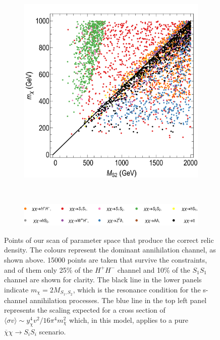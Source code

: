 \begin{figure}[t]
\begin{subfigure}[t]{0.43\textwidth}
\includegraphics[width=\textwidth]{texinputs/05_relic/figures/relic_scalar/MS2_mDM3.pdf}
\label{fig:scan1d}
\end{subfigure}\\
\begin{subfigure}[t]{0.86\textwidth}
\includegraphics[width=\textwidth]{texinputs/05_relic/figures/relic_scalar/LegendH2.pdf}
\end{subfigure}
\caption{Points of our scan of parameter space that produce the correct relic density. The colours represent the dominant annihilation channel, as shown above. 15000 points are taken that survive the constraints, and of them only 25\% of the $H^+H^-$ channel and 10\% of the $S_1S_1$ channel are shown for clarity. The black line in the lower panels indicate $m_\chi = 2 M_{S_1, S_2}$, which is the resonance condition for the s-channel annihilation processes. The blue line in the top left panel represents the scaling expected for a cross section of $\langle \sigma v \rangle \sim y^4_\chi v^2 / 16 \pi^4 m_\chi^2$ which, in this model, applies to a pure $\overline{\chi}\chi \to S_iS_i$ scenario.}
\label{fig:scan1}
\end{figure}

